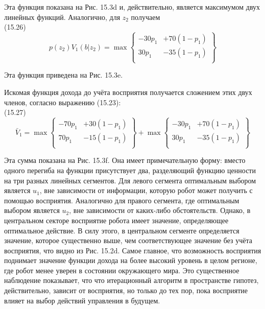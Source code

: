 \documentclass[10pt,a4paper]{article}
\begin{document}
Эта функция показана на Рис. 15.3d и, действительно, является максимумом двух линейных функций. Аналогично, для $z_2$ получаем\\

(15.26)
\begin{equation*}
p(z_2)V_1(b|z_2)=\max\left\{
\begin{array}{rr}
-30p_1&+70(1-p_1)\\
30p_1&-35(1-p_1)\\
\end{array}
\right\}
\end{equation*}

Эта функция приведена на Рис. 15.3e.

Искомая функция дохода до учёта восприятия получается сложением этих двух членов, согласно выражению (15.23):\\

(15.27)
\begin{equation*}
\bar{V}_1=\max\left\{
\begin{array}{rr}
-70p_1&+30(1-p_1)\\
70p_1&-15(1-p_1)\\
\end{array}
\right\}
+\max\left\{
\begin{array}{rr}
-30p_1&+70(1-p_1)\\
30p_1&-35(1-p_1)\\
\end{array}
\right\}
\end{equation*}

Эта сумма показана на Рис. 15.3f. Она имеет примечательную форму: вместо одного перегиба на функции присутствует два, разделяющий функцию ценности на три разных линейных сегментов. Для левого сегмента оптимальным выбором является $u_1$, вне зависимости от информации, которую робот может получить с помощью восприятия. Аналогично для правого сегмента, где оптимальным выбором является $u_2$, вне зависимости от каких-либо обстоятельств. Однако, в центральном секторе восприятие робота имеет значение, определяющее оптимальное действие. В силу этого, в центральном сегменте определяется значение, которое существенно выше, чем соответствующее значение без учёта восприятия, что видно из Рис. 15.2d. Самое главное, что возможность восприятия поднимает значение функции дохода на более высокий уровень в целом регионе, где робот менее уверен в состоянии окружающего мира. Это существенное наблюдение показывает, что что итерационный алгоритм в пространстве гипотез, действительно, зависит от восприятия, но только до тех пор, пока восприятие влияет на выбор действий управления в будущем.
\end{document}
